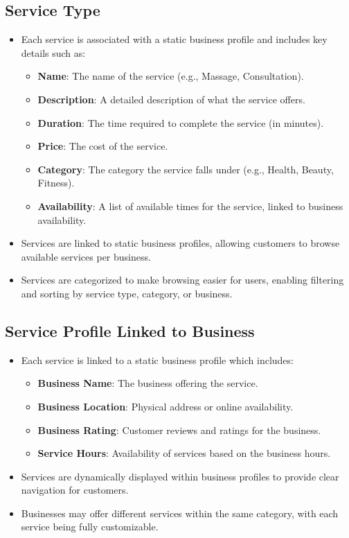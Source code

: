 \subsection{Service Type}  
\begin{itemize}  
    \item Each service is associated with a static business profile and includes key details such as:  
        \begin{itemize}  
            \item \textbf{Name}: The name of the service (e.g., Massage, Consultation).  
            \item \textbf{Description}: A detailed description of what the service offers.  
            \item \textbf{Duration}: The time required to complete the service (in minutes).  
            \item \textbf{Price}: The cost of the service.  
            \item \textbf{Category}: The category the service falls under (e.g., Health, Beauty, Fitness).  
            \item \textbf{Availability}: A list of available times for the service, linked to business availability.
        \end{itemize}
    \item Services are linked to static business profiles, allowing customers to browse available services per business.  
    \item Services are categorized to make browsing easier for users, enabling filtering and sorting by service type, category, or business.  
\end{itemize}

\subsection{Service Profile Linked to Business}  
\begin{itemize}  
    \item Each service is linked to a static business profile which includes:  
        \begin{itemize}  
            \item \textbf{Business Name}: The business offering the service.  
            \item \textbf{Business Location}: Physical address or online availability.  
            \item \textbf{Business Rating}: Customer reviews and ratings for the business.  
            \item \textbf{Service Hours}: Availability of services based on the business hours.
        \end{itemize}
    \item Services are dynamically displayed within business profiles to provide clear navigation for customers.  
    \item Businesses may offer different services within the same category, with each service being fully customizable.
\end{itemize}  

